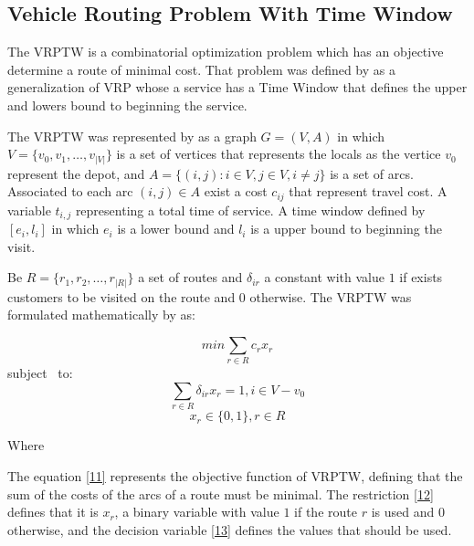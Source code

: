 \subsection{Vehicle Routing Problem With Time Window}

The \ac{VRPTW} is a combinatorial optimization problem which has an objective determine a route of minimal cost. That problem was defined by  as a generalization of \ac{VRP} whose a service has a Time Window that defines the upper and lowers bound to beginning the service.


The \ac{VRPTW} was represented by  as a graph $G = (V,A)$ in which $V = \{v_0,v_1,\ldots,v_{|V|} \}$ is a set of vertices that represents the locals as the vertice $v_0$ represent the depot, and $A = \{(i,j) : i\in V, j \in V, i \neq j \}$ is a set of arcs. Associated to each arc $(i,j) \in A$ exist a cost $c_{ij}$ that represent travel cost. A variable $t_{i,j}$ representing a total time of service. A time window defined by $[e_i,l_i]$ in which $e_i$ is a lower bound and  $l_i$ is a upper bound to beginning the visit.

Be $R = \{ r_1, r_2, \ldots, r_{|R|} \}$ a set of routes and $\delta_{ir}$ a constant with value $1$ if exists customers to be visited on the route and 0 otherwise. The \ac{VRPTW} was formulated mathematically by  as:

\begin{equation}\label{11}
min \sum_{r \in R} c_rx_r
\end{equation}
subject \ to:
\begin{equation}\label{12}
\sum_{r \in R} \delta_{ir}x_r = 1, i \in V-{v_0}
\end{equation}
\begin{equation}\label{13}
x_r \in \{ 0,1 \}, r \in R
\end{equation}

Where

The equation \ref{11} represents the objective function of \ac{VRPTW}, defining that the sum of the costs of the arcs of a route must be minimal. The restriction \ref{12} defines that it is $ x_r $, a binary variable with value $1$ if the route $r$ is used and $0$ otherwise, and the decision variable \ref{13} defines the values that should be used.